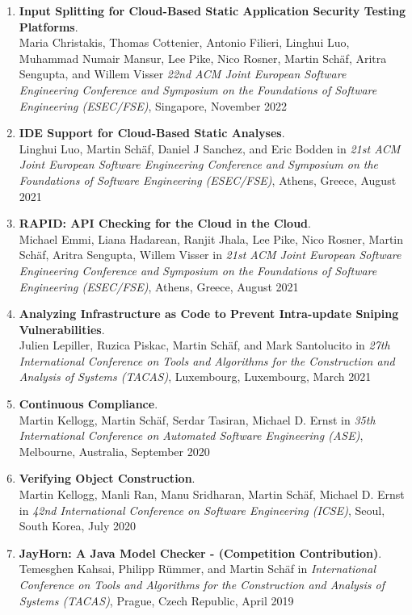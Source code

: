 \begin{enumerate}
\item \textbf{Input Splitting for Cloud-Based Static Application Security Testing Platforms}.
\\ Maria Christakis, Thomas Cottenier, Antonio Filieri, Linghui Luo, Muhammad Numair Mansur, Lee Pike, Nico Rosner, Martin Sch\"af, Aritra Sengupta, and Willem Visser
\emph{22nd ACM Joint European Software Engineering Conference and Symposium on the Foundations of Software Engineering (ESEC/FSE)},
Singapore, November 2022

\item \textbf{IDE Support for Cloud-Based Static Analyses}.
\\ Linghui Luo, Martin Sch\"af, Daniel J Sanchez, and Eric Bodden in 
\emph{21st ACM Joint European Software Engineering Conference and Symposium on the Foundations of Software Engineering (ESEC/FSE)},
Athens, Greece, August 2021

\item \textbf{RAPID: API Checking for the Cloud in the Cloud}.
\\ Michael Emmi, Liana Hadarean, Ranjit Jhala, Lee Pike, Nico Rosner, Martin Sch\"af, Aritra Sengupta, Willem Visser in 
\emph{21st ACM Joint European Software Engineering Conference and Symposium on the Foundations of Software Engineering (ESEC/FSE)},
Athens, Greece, August 2021

\item \textbf{Analyzing Infrastructure as Code to Prevent Intra-update Sniping Vulnerabilities}.
\\ Julien Lepiller, Ruzica Piskac, Martin Sch\"af, and Mark Santolucito in 
\emph{27th International Conference on Tools and Algorithms for the Construction and Analysis of Systems (TACAS)},
Luxembourg, Luxembourg, March 2021

\item \textbf{Continuous Compliance}.
\\ Martin Kellogg, Martin Sch\"af, Serdar Tasiran, Michael D. Ernst in 
\emph{35th International Conference on Automated Software Engineering (ASE)},
Melbourne, Australia, September 2020

\item \textbf{Verifying Object Construction}.
\\ Martin Kellogg, Manli Ran, Manu Sridharan, Martin Sch\"af, Michael D. Ernst in 
\emph{42nd International Conference on Software Engineering (ICSE)},
Seoul, South Korea, July 2020

\item \textbf{JayHorn: A Java Model Checker - (Competition Contribution)}.
\\ Temesghen Kahsai, Philipp R\"ummer, and Martin Sch\"af in 
\emph{International Conference on Tools and Algorithms for the Construction and Analysis of Systems (TACAS)},
Prague, Czech Republic, April 2019


\end{enumerate}
